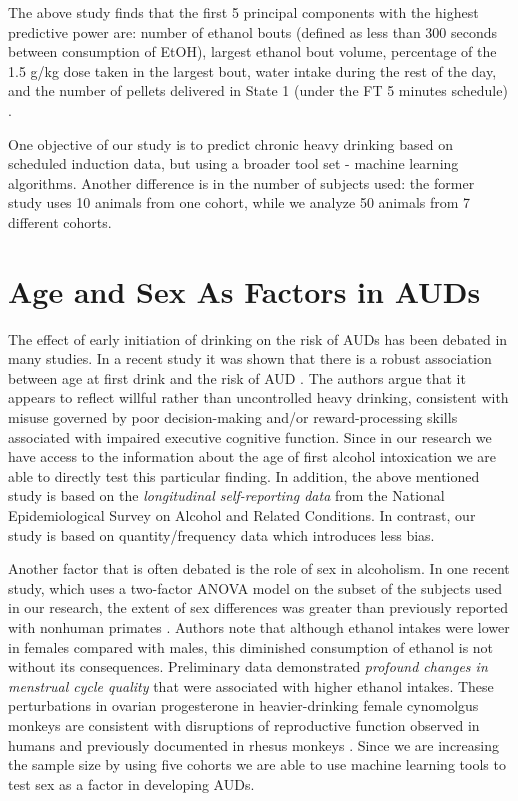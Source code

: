 The above study finds that the first 5 principal components with the highest predictive power are: number of ethanol bouts (defined as less than 300 seconds between consumption of EtOH), largest ethanol bout volume, percentage of the 1.5 g/kg dose taken in the largest bout, water intake during the rest of the day, and the number of pellets delivered in State 1 (under the FT 5 minutes schedule) . 

One objective of our study is to predict chronic heavy drinking based on scheduled induction data, but using a broader tool set - machine learning algorithms. Another difference is in the number of subjects used: the former study uses 10 animals from one cohort, while we analyze 50 animals from 7 different cohorts.

\section{Age and Sex As Factors in AUDs}
The effect of early initiation of drinking on the risk of AUDs has been debated in many studies. In a recent study it was shown that there is a robust association between age at first drink and the risk of AUD . The authors argue that it appears to reflect willful rather than uncontrolled heavy drinking, consistent with misuse governed by poor decision-making and/or reward-processing skills associated with impaired executive cognitive function. Since in our research we have access to the information about the age of first alcohol intoxication we are able to directly test this particular finding. In addition, the above mentioned study is based on the \textit{longitudinal self-reporting data} from the National Epidemiological Survey on Alcohol and Related Conditions. In contrast, our study is based on quantity/frequency data which introduces less bias. 

Another factor that is often debated is the role of sex in alcoholism. In one recent study, which uses a two-factor ANOVA model on the subset of the subjects used in our research, the extent of sex differences was greater than previously reported with nonhuman primates . Authors note that although ethanol intakes were lower in females compared with males, this diminished consumption of ethanol is not without its consequences. Preliminary data demonstrated \textit{profound changes in menstrual cycle quality} that were associated with higher ethanol intakes. These perturbations in ovarian progesterone in heavier-drinking female cynomolgus monkeys are consistent with disruptions of reproductive function observed in humans and previously documented in rhesus monkeys . Since we are increasing the sample size by using five cohorts we are able to use machine learning tools to test sex as a factor in developing AUDs. 


